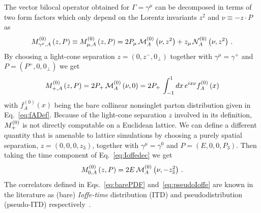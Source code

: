 The vector bilocal operator obtained for $\Gamma=\gamma^\mu$ can be decomposed  
in terms of two form factors which only depend on the Lorentz invariants $z^2$ and $\nu \equiv - z\cdot P$ as 
\begin{align}
	\label{eq:Ioffedec}	
	M^{(0)}_{\gamma^\mu,A}\left(z, P\right) \equiv M^{(0)}_{\mu,A}\left(z,P\right)    
     = 2 P_\mu\,\mathcal{M}_A^{(0)} \left( \nu,z^2 \right)
    + z_\mu\, \mathcal{N}_A^{(0)}\left( \nu,z^2 \right) \, .
\end{align}
By choosing a light-cone separation $z=\left(0,z^-,0_{\perp}\right)$ together with
$\gamma^{\mu}=\gamma^{+}$ and $P=\left(P^+,0,0_{\perp}\right)$ we get
\begin{align}
	\label{eq:barePDF}
	M^{(0)}_{+,A}\left(z, P\right)
	= 2 P_+\,\mathcal{M}_A^{(0)}\left( \nu,0 \right)
	= 2 P_+\, \int_{-1}^{1} dx\, e^{i x\nu} f_A^{(0)}\left(x\right)
\end{align}
with $f_A^{(0)}\left(x\right)$ being the bare collinear nonsinglet parton distribution given in Eq.~\eqref{eq:fADef}.
Because of the light-cone separation $z$ involved in its definition,
$M^{(0)}_{+}$ is not directly computable on a Euclidean lattice. We can define a
different quantity that is amenable to lattice simulations  by choosing a purely
spatial separation, $z=\left(0,0,0,z_3\right)$, together with
$\gamma^{\mu}=\gamma^{0}$ and $P=\left(E,0,0,P_3\right)$. Then taking the time
component of Eq.~\eqref{eq:Ioffedec} we get
\begin{align}
	\label{eq:pseudoIoffe}
	M^{(0)}_{0,A}\left(z, P\right) 
	= 2 E\,\mathcal{M}_A^{(0)}\left( \nu,-z_3^2 \right) \, .
\end{align}
The correlators defined in Eqs.~\eqref{eq:barePDF} and~\eqref{eq:pseudoIoffe}
are known in the literature as (bare) \textit{Ioffe-time} distribution (ITD) and
pseudodistribution (pseudo-ITD)
respectively~\cite{Radyushkin:2017cyf,Braun:1994jq}. 

